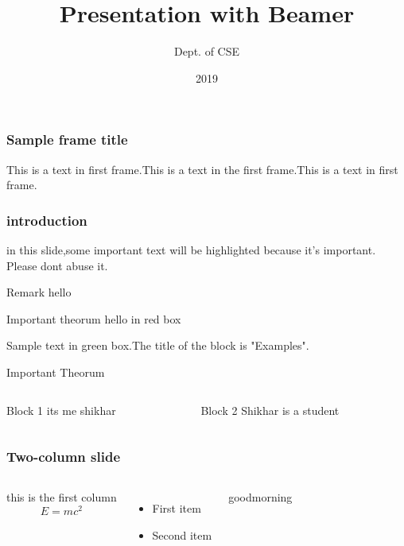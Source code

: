 \documentclass[17pt]{beamer}
\title{Presentation with Beamer}
\author{Dept. of CSE}
\institute{MIT,Manipal}
\date{2019}
\begin{document}
\frame{\titlepage}
\begin{frame}
\frametitle{Sample frame title}This is a text in first frame.This is a text in the first frame.This is a text in first frame.
\end{frame}
\begin{frame}
\frametitle{introduction}in this slide,some important text will be \alert{highlighted} because it's important.
Please dont abuse it.
\begin{block}{Remark}
	hello
\end{block}
\begin{alertblock}{Important theorum}
	hello in red box
\end{alertblock}
\begin{examples}
	Sample text in green box.The title of the block is "Examples".
	\end{examples}	
\end{frame}
\begin{alertblock}{Important Theorum}\end{alertblock}
\begin{columns}
	\begin{column}{.5\textwidth}\begin{block}{Block 1}
			its me shikhar
		\end{block}\end{column}\begin{column}{.5\textwidth}
	\begin{block}{Block 2}
		Shikhar is a student
	\end{block}
\end{column}
\end{columns}
\begin{frame}
\frametitle{Two-column slide}
\begin{columns}
this is the first column
$$E=mc^2$$
\begin{itemize}
	\item First item
	\item Second item
\end{itemize}
goodmorning
\end{columns}
\end{frame}
\end{document}
